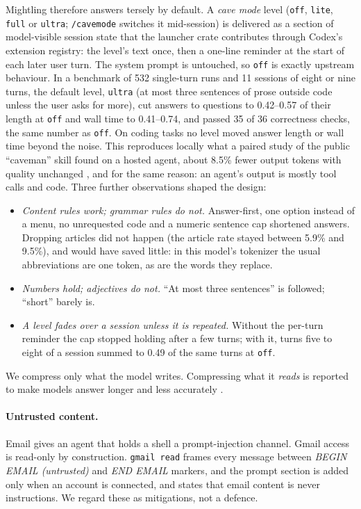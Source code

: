 \documentclass[11pt]{article}
\newcommand{\code}[1]{\texttt{#1}}
\begin{document}
Mightling therefore answers tersely by default. A \emph{cave mode} level (\code{off}, \code{lite},
\code{full} or \code{ultra}; \code{/cavemode} switches it mid-session) is delivered as a section of
model-visible session state that the launcher crate contributes through Codex's extension
registry: the level's text once, then a one-line reminder at the start of each later user turn.
The system prompt is untouched, so \code{off} is exactly upstream behaviour. In a benchmark of 532
single-turn runs and 11 sessions of eight or nine turns, the default level, \code{ultra} (at most
three sentences of prose outside code unless the user asks for more), cut answers to questions to
0.42--0.57 of their length at \code{off} and wall time to 0.41--0.74, and passed 35 of 36
correctness checks, the same number as \code{off}. On coding tasks no level moved answer length
or wall time beyond the noise. This reproduces locally what a paired study of the public
``caveman'' skill found on a hosted agent, about 8.5\% fewer output tokens with quality unchanged
\cite{shiryaev2026caveman}, and for the same reason: an agent's output is mostly tool calls and
code. Three further observations shaped the design:
\begin{itemize}
  \item \emph{Content rules work; grammar rules do not.} Answer-first, one option instead of a
    menu, no unrequested code and a numeric sentence cap shortened answers. Dropping articles
    did not happen (the article rate stayed between 5.9\% and 9.5\%), and would have saved little:
    in this model's tokenizer the usual abbreviations are one token, as are the words they replace.
  \item \emph{Numbers hold; adjectives do not.} ``At most three sentences'' is followed; ``short''
    barely is.
  \item \emph{A level fades over a session unless it is repeated.} Without the per-turn reminder
    the cap stopped holding after a few turns; with it, turns five to eight of a session summed to
    0.49 of the same turns at \code{off}.
\end{itemize}
We compress only what the model writes. Compressing what it \emph{reads} is reported to make
models answer longer and less accurately \cite{adeyemi2026cavewoman}.

\paragraph{Untrusted content.} Email gives an agent that holds a shell a prompt-injection channel.
Gmail access is read-only by construction. \code{gmail read} frames every message between
\emph{BEGIN EMAIL (untrusted)} and \emph{END EMAIL} markers, and the prompt section is added only when
an account is connected, and states that email content is never instructions. We regard these as
mitigations, not a defence.
\end{document}
